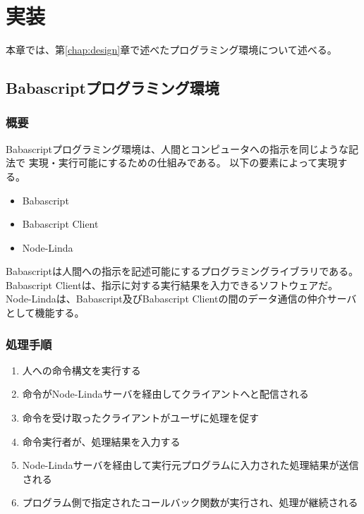 \chapter{実装}\label{chap:implementation}

本章では、第\ref{chap:design}章で述べたプログラミング環境について述べる。

\section{Babascriptプログラミング環境}\label{babascriptux30d7ux30edux30b0ux30e9ux30dfux30f3ux30b0ux74b0ux5883}

\subsection{概要}\label{ux6982ux8981}

Babascriptプログラミング環境は、人間とコンピュータへの指示を同じような記法で
実現・実行可能にするための仕組みである。 以下の要素によって実現する。

\begin{itemize}
\itemsep1pt\parskip0pt
\item
  Babascript
\item
  Babascript Client
\item
  Node-Linda
\end{itemize}

Babascriptは人間への指示を記述可能にするプログラミングライブラリである。
Babascript Clientは、指示に対する実行結果を入力できるソフトウェアだ。
Node-Lindaは、Babascript及びBabascript
Clientの間のデータ通信の仲介サーバとして機能する。

\subsection{処理手順}\label{ux51e6ux7406ux624bux9806}

\begin{enumerate}
\def\labelenumi{\arabic{enumi}.}
\itemsep1pt\parskip0pt
\item
  人への命令構文を実行する
\item
  命令がNode-Lindaサーバを経由してクライアントへと配信される
\item
  命令を受け取ったクライアントがユーザに処理を促す
\item
  命令実行者が、処理結果を入力する
\item
  Node-Lindaサーバを経由して実行元プログラムに入力された処理結果が送信される
\item
  プログラム側で指定されたコールバック関数が実行され、処理が継続される
\end{enumerate}

